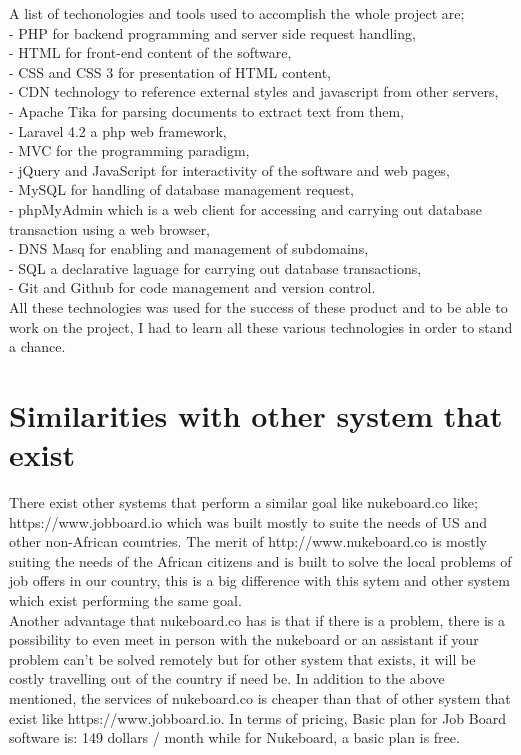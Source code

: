 A list of techonologies and tools used to accomplish the whole project are;\\
- PHP for backend programming and server side request handling, \\
- HTML for front-end content of the software, \\
- CSS and CSS 3 for presentation of HTML content, \\
- CDN technology to reference external styles and javascript from other servers, \\
- Apache Tika for parsing documents to extract text from them, \\
- Laravel 4.2 a php web framework, \\
- MVC for the programming paradigm, \\
- jQuery and JavaScript for interactivity of the software and web pages, \\
- MySQL for handling of database management request, \\
- phpMyAdmin which is a web client for accessing and carrying out database transaction using a web browser,\\
- DNS Masq for enabling and management of subdomains, \\
- SQL a declarative laguage for carrying out database transactions, \\
- Git and Github for code management and version control.\\

 All these technologies was used for the success of these product and to be able to work on the project, I had to learn all these various technologies in order to stand a chance. \\

\section{Similarities with other system that exist}

There exist other systems that perform a similar goal like nukeboard.co like;\\
 https://www.jobboard.io which was built mostly to suite the needs of US and other non-African countries. The merit of http://www.nukeboard.co is mostly suiting the needs of the African citizens and is built to solve the local problems of job offers in our country, this is a big difference with this sytem and other system which exist performing the same goal. \\

Another advantage that nukeboard.co has is that if there is a problem, there is a possibility to even meet in person with the nukeboard or an assistant if your problem can't be solved remotely but for other system that exists, it will be costly travelling out of the country if need be. In addition to the above mentioned, the services of nukeboard.co is cheaper than that of other system that exist like https://www.jobboard.io. In terms of pricing, Basic plan for Job Board software is: 149 dollars / month while for Nukeboard, a basic plan is free. \\

